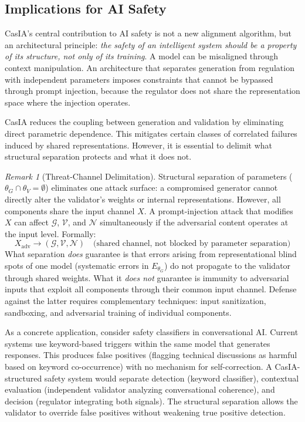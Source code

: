 \documentclass[11pt,a4paper]{article}
\theoremstyle{remark}
\newtheorem{remark}{Remark}[section]
\begin{document}
\subsection{Implications for AI Safety}

CasIA's central contribution to AI safety is not a new alignment algorithm, but an architectural principle: \emph{the safety of an intelligent system should be a property of its structure, not only of its training}. A model can be misaligned through context manipulation. An architecture that separates generation from regulation with independent parameters imposes constraints that cannot be bypassed through prompt injection, because the regulator does not share the representation space where the injection operates.

CasIA reduces the coupling between generation and validation by eliminating direct parametric dependence. This mitigates certain classes of correlated failures induced by shared representations. However, it is essential to delimit what structural separation protects and what it does not.

\begin{remark}[Threat-Channel Delimitation]
\label{rem:threat_channel}
Structural separation of parameters ($\theta_G \cap \theta_V = \emptyset$) eliminates one attack surface: a compromised generator cannot directly alter the validator's weights or internal representations. However, all components share the input channel $X$. A prompt-injection attack that modifies $X$ can affect $\mathcal{G}$, $\mathcal{V}$, and $\mathcal{N}$ simultaneously if the adversarial content operates at the input level. Formally:
\begin{equation}
  X_{\text{adv}} \to (\mathcal{G}, \mathcal{V}, \mathcal{N}) \quad \text{(shared channel, not blocked by parameter separation)}
\end{equation}
What separation \emph{does} guarantee is that errors arising from representational blind spots of one model (systematic errors in $E_{\theta_G}$) do not propagate to the validator through shared weights. What it \emph{does not} guarantee is immunity to adversarial inputs that exploit all components through their common input channel. Defense against the latter requires complementary techniques: input sanitization, sandboxing, and adversarial training of individual components.
\end{remark}

As a concrete application, consider safety classifiers in conversational AI. Current systems use keyword-based triggers within the same model that generates responses. This produces false positives (flagging technical discussions as harmful based on keyword co-occurrence) with no mechanism for self-correction. A CasIA-structured safety system would separate detection (keyword classifier), contextual evaluation (independent validator analyzing conversational coherence), and decision (regulator integrating both signals). The structural separation allows the validator to override false positives without weakening true positive detection.
\end{document}

